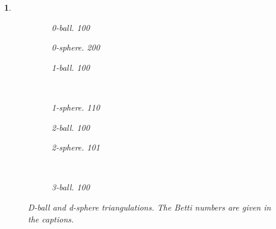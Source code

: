 \documentclass[10pt]{article} %
\theoremstyle{problemstyle}
\newtheorem{question}{\arabic{question}}
\begin{document}
\begin{question}
\begin{figure}[H]
	\centering
	\begin{subfigure}{0.3\linewidth}
		\begin{mdframed}[roundcorner=10pt]
			\centering
			
		\end{mdframed}
	
		\caption{0-ball. 100}
		\label{fig:0-ball} 
	\end{subfigure}
	\hfill
	\begin{subfigure}{0.3\linewidth}
		\centering
		\begin{mdframed}[roundcorner=10pt]
			\centering
			
		 \end{mdframed}
		\caption{0-sphere. 200}
		\label{fig:0-sphere} 
	\end{subfigure}
	\hfill
	\begin{subfigure}[H]{0.3\linewidth}
		\centering
		\begin{mdframed}[roundcorner=10pt]
			\centering
			
		\end{mdframed}
		\caption{1-ball. 100}
		\label{fig:1-ball}
	\end{subfigure}
	\\[\baselineskip]
	\begin{subfigure}{0.3\linewidth}
		\begin{mdframed}[roundcorner=10pt]
			\centering
			
		\end{mdframed}
		\caption{1-sphere. 110}
		\label{fig:1-sphere} 
	\end{subfigure}
	\hfill
	\begin{subfigure}[H]{0.3\linewidth}
		\centering
		\begin{mdframed}[roundcorner=10pt]
			\centering
			
		\end{mdframed}
		\caption{2-ball. 100}
		\label{fig:2-ball}
	\end{subfigure}
	\hfill
	\begin{subfigure}{0.3\linewidth}
		\begin{mdframed}[roundcorner=10pt]
			\centering
			
		\end{mdframed}
		\caption{2-sphere. 101}
		\label{fig:2-sphere} 
	\end{subfigure}
	\\[\baselineskip]
	\begin{subfigure}[H]{0.3\linewidth}
		\begin{mdframed}[roundcorner=10pt]
		\centering
		
		\end{mdframed}
		\caption{3-ball. 100}
		\label{fig:3-ball}
	\end{subfigure}
	\centering
	\caption{D-ball and d-sphere triangulations. The Betti numbers are given in the captions.}
	\label{fig:d}
\end{figure}

\end{question}
\end{document}
